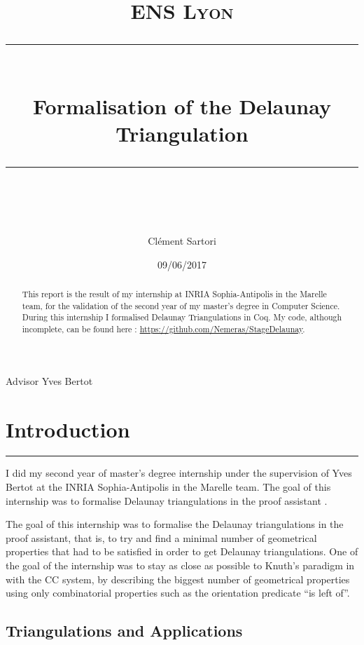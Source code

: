 \documentclass[a4paper,10pt]{article}
\title{
\normalfont \normalsize 
\textsc{ENS Lyon} \\
[10pt] 
\rule{\linewidth}{0.5pt} \\[6pt] 
\huge Formalisation of the Delaunay Triangulation \\
\rule{\linewidth}{2pt}  \\[10pt]
}
\author{Clément Sartori}
\date{\normalsize 09/06/2017}
\begin{document}
\maketitle
\noindent
Advisor \dotfill Yves Bertot \\


\maketitle

\begin{abstract}
  This report is the result of my internship at INRIA Sophia-Antipolis in the Marelle team, for the validation of the second year of my master's degree in Computer Science. During this internship I formalised Delaunay Triangulations in Coq. My code, although incomplete, can be found here : \href{https://github.com/Nemeras/StageDelaunay}{https://github.com/Nemeras/StageDelaunay}.
\end{abstract}

\tableofcontents{}

\newpage

\section{Introduction}
\rule{\linewidth}{0.5pt}

I did my second year of master's degree internship under the supervision of Yves Bertot at the INRIA Sophia-Antipolis in the Marelle team. The goal of this internship was to formalise Delaunay triangulations in the proof assistant {}.

The goal of this internship was to formalise the Delaunay triangulations in the {} proof assistant, that is, to try and find a minimal number of geometrical properties that had to be satisfied in order to get Delaunay triangulations. One of the goal of the internship was to stay as close as possible to Knuth's paradigm in \cite{Knuth92} with the CC system, by describing the biggest number of geometrical properties using only combinatorial properties such as the orientation predicate ``is left of''.

\subsection{Triangulations and Applications}
\end{document}
